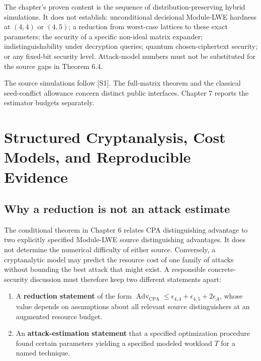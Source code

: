 \documentclass[
  11pt,
  a4paper,
  oneside]{report}
\providecommand{\tightlist}{%
  \setlength{\itemsep}{0pt}\setlength{\parskip}{0pt}}
\begin{document}
The chapter's proven content is the sequence of distribution-preserving
hybrid simulations. It does not establish: unconditional decisional
Module-LWE hardness at \((4,4)\) or \((4,5)\); a reduction from
worst-case lattices to these exact parameters; the security of a
specific non-ideal matrix expander; indistinguishability under
decryption queries; quantum chosen-ciphertext security; or any fixed-bit
security level. Attack-model numbers must not be substituted for the
source gaps in Theorem 6.4.

The source simulations follow {[}S1{]}. The full-matrix theorem and the
classical seed-conflict allowance concern distinct public interfaces.
Chapter 7 reports the estimator budgets separately.

\chapter{Structured Cryptanalysis, Cost Models, and Reproducible
Evidence}\label{structured-cryptanalysis-cost-models-and-reproducible-evidence}

\section{Why a reduction is not an attack
estimate}\label{why-a-reduction-is-not-an-attack-estimate}

The conditional theorem in Chapter 6 relates CPA distinguishing
advantage to two explicitly specified Module-LWE source distinguishing
advantages. It does not determine the numerical difficulty of either
source. Conversely, a cryptanalytic model may predict the resource cost
of one family of attacks without bounding the best attack that might
exist. A responsible concrete-security discussion must therefore keep
two different statements apart:

\begin{enumerate}
\def\labelenumi{\arabic{enumi}.}
\tightlist
\item
  A \textbf{reduction statement} of the form
  \(\operatorname{Adv}_{\mathrm{CPA}}\le\epsilon_{4,4}+\epsilon_{4,5}+2\epsilon_A\),
  whose value depends on assumptions about all relevant source
  distinguishers at an augmented resource budget.
\item
  An \textbf{attack-estimation statement} that a specified optimization
  procedure found certain parameters yielding a specified modeled
  workload \(T\) for a named technique.
\end{enumerate}
\end{document}
